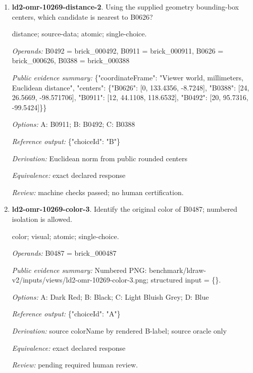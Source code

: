 \begin{enumerate}
\par{\small shape-match; visual; atomic; single-choice.\par\textit{Operands:} B0970 = brick\_000970, B0626 = brick\_000626, B0359 = brick\_000359, B0405 = brick\_000405, B0474 = brick\_000474\par\textit{Public evidence summary:} Numbered PNG: benchmark/ldraw-v2/inputs/views/ld2-omr-10269-shape-match-2.png; structured input = \{\}.\par\textit{Options:} A: B0359; B: B0405; C: B0970; D: B0474\par\textit{Reference output:} \{"choiceId": "D"\}\par\textit{Derivation:} source partNumber equality across labeled candidates; source oracle only\par\textit{Equivalence:} same source partNumber; ignore color and pose; perceptual equivalence pending\par\textit{Review:} pending required human review.}
\item \textbf{ld2-omr-10269-distance-2}. Using the supplied geometry bounding-box centers, which candidate is nearest to B0626?
\par{\small distance; source-data; atomic; single-choice.\par\textit{Operands:} B0492 = brick\_000492, B0911 = brick\_000911, B0626 = brick\_000626, B0388 = brick\_000388\par\textit{Public evidence summary:} \{"coordinateFrame": "Viewer world, millimeters, Euclidean distance", "centers": \{"B0626": [0, 133.4356, -8.7248], "B0388": [24, 26.5669, -98.571706], "B0911": [12, 44.1108, 118.6532], "B0492": [20, 95.7316, -99.5424]\}\}\par\textit{Options:} A: B0911; B: B0492; C: B0388\par\textit{Reference output:} \{"choiceId": "B"\}\par\textit{Derivation:} Euclidean norm from public rounded centers\par\textit{Equivalence:} exact declared response\par\textit{Review:} machine checks passed; no human certification.}
\item \textbf{ld2-omr-10269-color-3}. Identify the original color of B0487; numbered isolation is allowed.
\par{\small color; visual; atomic; single-choice.\par\textit{Operands:} B0487 = brick\_000487\par\textit{Public evidence summary:} Numbered PNG: benchmark/ldraw-v2/inputs/views/ld2-omr-10269-color-3.png; structured input = \{\}.\par\textit{Options:} A: Dark Red; B: Black; C: Light Bluish Grey; D: Blue\par\textit{Reference output:} \{"choiceId": "A"\}\par\textit{Derivation:} source colorName by rendered B-label; source oracle only\par\textit{Equivalence:} exact declared response\par\textit{Review:} pending required human review.}

\end{enumerate}
